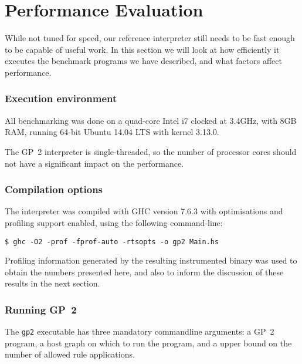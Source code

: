 \section{Performance Evaluation}\label{sec:performanceevaluation}

While not tuned for speed, our reference interpreter still needs to be fast enough to be capable of useful work. In this section we will look at how efficiently it executes the benchmark programs we have described, and what factors affect performance.



\subsubsection*{Execution environment}

All benchmarking was done on a quad-core Intel i7 clocked at 3.4GHz, with 8GB RAM, running 64-bit Ubuntu 14.04 LTS with kernel 3.13.0.

The GP~2 interpreter is single-threaded, so the number of processor cores should not have a significant impact on the performance.


\subsubsection*{Compilation options}

The interpreter was compiled with GHC version 7.6.3 with optimisations and profiling support enabled, using the following command-line:

\begin{verbatim}
$ ghc -O2 -prof -fprof-auto -rtsopts -o gp2 Main.hs
\end{verbatim}

Profiling information generated by the resulting instrumented binary was used to obtain the numbers presented here, and also to inform the discussion of these results in the next section.


\subsubsection*{Running GP~2}

The \texttt{gp2} executable has three mandatory commandline arguments: a GP~2 program, a host graph on which to run the program, and a upper bound on the number of allowed rule applications.

